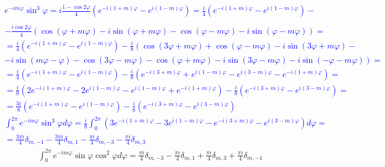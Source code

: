 \textcolor{blue}{ \begin{equation*} \begin{aligned}
e^{-i m \varphi} \sin^3 \varphi = 
i \frac{1 - \cos 2 \varphi}{4}
\left( e^{-i(1+m)\varphi} - e^{i(1-m)\varphi} \right) = 
\frac{i}{4} \left( e^{-i(1+m)\varphi} - e^{i(1-m)\varphi} \right) - \\
\\ - \frac{i \cos 2 \varphi}{4} \left( 
\cos (\varphi + m \varphi) - i \sin (\varphi + m \varphi) - 
\cos (\varphi - m \varphi) - i \sin (\varphi - m \varphi) \right) = \\
= \frac{i}{4} \left( e^{-i(1+m)\varphi} - e^{i(1-m)\varphi} \right) - 
\frac{i}{8} \left( \cos (3 \varphi + m \varphi) +
\cos (\varphi - m \varphi) - i \sin (3 \varphi + m \varphi) \right. - \\
- \left. i \sin (m \varphi - \varphi) - \cos (3 \varphi - m \varphi) - 
\cos (\varphi + m \varphi) - i \sin (3 \varphi - m \varphi) - 
i \sin (- \varphi - m \varphi) \right) = \\
= \frac{i}{4} \left( e^{-i(1+m)\varphi} - e^{i(1-m)\varphi} \right) - 
\frac{i}{8} \left( e^{-i (3+m) \varphi} + e^{i (1-m) \varphi}
- e^{i (3-m) \varphi} - e^{-i (1+m) \varphi} \right) = \\
= \frac{i}{8} \left( 2 e^{-i(1+m)\varphi} - 2 e^{i(1-m)\varphi} - 
e^{i(1-m)\varphi} + e^{-i(1+m)\varphi} \right) - 
\frac{i}{8} \left( e^{-i (3+m) \varphi} - e^{i (3-m) \varphi} \right) = \\
= \frac{3i}{8} \left( e^{-i(1+m)\varphi} - e^{i(1-m)\varphi} \right) - 
\frac{i}{8} \left( e^{-i (3+m) \varphi} - e^{i (3-m) \varphi} \right)
\end{aligned} \end{equation*} }
%
\textcolor{blue}{ \begin{equation*} \begin{aligned}
\int_{0}^{2\pi} e^{-i m \varphi} \sin^3 \varphi d \varphi = 
\frac{i}{8} \int_{0}^{2\pi} 
\left( 3 e^{-i(1+m)\varphi} - 3 e^{i(1-m)\varphi} - 
e^{-i (3+m) \varphi} - e^{i (3-m) \varphi} \right) d \varphi = \\
= \frac{3 \pi i}{4} \delta_{m,-1} - \frac{3 \pi i}{4} \delta_{m,1} - 
\frac{\pi i}{4} \delta_{m,-3} - \frac{\pi i}{4} \delta_{m,3}
\end{aligned} \end{equation*} }
%
\begin{equation} \begin{aligned} \label{eq:int_exp5}
\int_{0}^{2\pi} e^{-i m \varphi} \sin \varphi \cos^2 \varphi d \varphi = 
\frac{\pi i }{4} \delta_{m,-3} - \frac{\pi i }{4} \delta_{m,1} + 
\frac{\pi i }{4} \delta_{m,3} + \frac{\pi i }{4} \delta_{m,-1}
\end{aligned} \end{equation}
